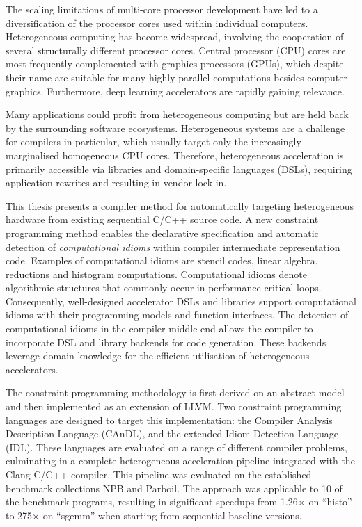     The scaling limitations of multi-core processor development have led to a
    diversification of the processor cores used within individual computers.
    Heterogeneous computing has become widespread, involving the cooperation of
    several structurally different processor cores.
    Central processor (CPU) cores are most frequently complemented with graphics
    processors (GPUs), which despite their name are suitable for many highly
    parallel computations besides computer graphics.
    Furthermore, deep learning accelerators are rapidly gaining relevance.

    Many applications could profit from heterogeneous computing but are held
    back by the surrounding software ecosystems.
    Heterogeneous systems are a challenge for compilers in particular, which
    usually target only the increasingly marginalised homogeneous CPU cores.
    Therefore, heterogeneous acceleration is primarily accessible via libraries
    and domain-specific languages (DSLs), requiring application rewrites and
    resulting in vendor lock-in.

    This thesis presents a compiler method for automatically targeting
    heterogeneous hardware from existing sequential C/C++ source code.
    A new constraint programming method enables the declarative
    specification and automatic detection of {\em computational idioms} within
    compiler intermediate representation code.
    Examples of computational idioms are stencil codes, linear algebra,
    reductions and histogram computations.
    Computational idioms denote algorithmic structures that commonly occur in
    performance-critical loops.
    Consequently, well-designed accelerator DSLs and libraries support
    computational idioms with their programming models and function interfaces.
    The detection of computational idioms in the compiler middle end allows the
    compiler to incorporate DSL and library backends for code generation.
    These backends leverage domain knowledge for the efficient utilisation of
    heterogeneous accelerators.

    The constraint programming methodology is first derived on an abstract
    model and then implemented as an extension of LLVM.
    Two constraint programming languages are designed to target this
    implementation:
    the Compiler Analysis Description Language (CAnDL), and the extended
    Idiom Detection Language (IDL).
    These languages are evaluated on a range of different compiler problems,
    culminating in a complete heterogeneous acceleration pipeline integrated
    with the Clang C/C++ compiler.
    This pipeline was evaluated on the established benchmark collections NPB
    and Parboil.
    The approach was applicable to 10 of the benchmark programs, resulting in
    significant speedups from 1.26$\times$ on ``histo'' to 275$\times$ on
    ``sgemm'' when starting from sequential baseline versions.


